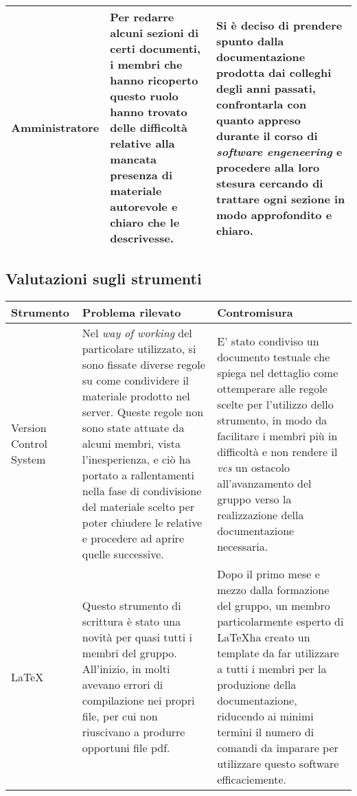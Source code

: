 \begin{center}
\begin{longtable}{|p{3cm}|p{6cm}|p{6cm}|}
	\hline
	Amministratore
	 &
	Per redarre alcuni sezioni di certi documenti, i membri che hanno ricoperto questo ruolo hanno trovato delle difficoltà relative alla mancata presenza di materiale autorevole e chiaro che le descrivesse.
	 	& 
Si è deciso di prendere spunto dalla documentazione prodotta dai colleghi degli anni passati, confrontarla con quanto appreso durante il corso di \textit{software engeneering} e procedere alla loro stesura cercando di trattare ogni sezione in modo approfondito e chiaro. \\
	\hline	
	
		\end{longtable}
	\end{center}

	\newpage	
	
	\subsection{Valutazioni sugli strumenti}

		\begin{center}
	\begin{longtable}{|p{3cm}|p{6cm}|p{6cm}|}
	\hline
	\rowcolor{lighter-grayer}
	\textbf{Strumento} & \textbf{Problema rilevato} & \textbf{Contromisura}\\
	\hline
	\endfirsthead


	\hline
	Version Control System
	 &
	Nel \textit{way of working} del particolare \glock{vcs} utilizzato, si sono fissate diverse regole su come condividere il materiale prodotto nel server. Queste regole non sono state attuate da alcuni membri, vista l'inesperienza, e ciò ha portato a rallentamenti nella fase di condivisione del materiale scelto per poter chiudere le \glock{milestone} relative e procedere ad aprire quelle successive.  
	 	& 
E' stato condiviso un documento testuale che spiega nel dettaglio come ottemperare alle regole scelte per l'utilizzo dello strumento, in modo da facilitare i membri più in difficoltà e non rendere il \textit{vcs} un ostacolo all'avanzamento del gruppo verso la realizzazione della documentazione necessaria.  \\
	\hline
	
		\hline
	\LaTeX
	 &
	Questo strumento di scrittura è stato una novità per quasi tutti i membri del gruppo. All'inizio, in molti avevano errori di compilazione nei propri file, per cui non riuscivano a produrre opportuni file pdf. 
	 	& 
Dopo il primo mese e mezzo dalla formazione del gruppo, un membro particolarmente esperto di  \LaTeX ha creato un template da far utilizzare a tutti i membri per la produzione della documentazione, riducendo ai minimi termini il numero di comandi da imparare per utilizzare questo software efficaciemente.\\
	\hline
	
		\end{longtable}
	\end{center}